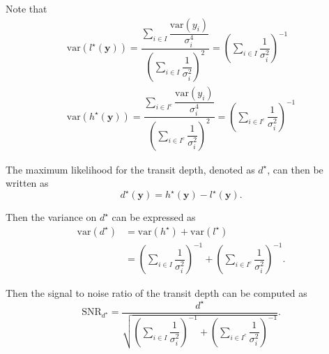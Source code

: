\documentclass{article}
\begin{document}
Note that
\begin{align}
    \mathrm{var}\left(l^{\star}(\bm{y})\right) = \dfrac{\displaystyle\sum_{i \in I}\dfrac{\mathrm{var}(y_i)}{\sigma^4_i}}
    {\displaystyle\left(\sum_{i\in I}\dfrac{1}{\sigma^2_i}\right)^{2}}
    = \displaystyle\left(\sum_{i\in I}\dfrac{1}{\sigma^2_i}\right)^{-1}\\
    \mathrm{var}\left(h^{\star}(\bm{y})\right) = \dfrac{\displaystyle\sum_{i \in I^c}\dfrac{\mathrm{var}(y_i)}{\sigma^4_i}}
    {\displaystyle\left(\sum_{i\in I^c}\dfrac{1}{\sigma^2_i}\right)^{2}}
    = \displaystyle\left(\sum_{i\in I^c}\dfrac{1}{\sigma^2_i}\right)^{-1}
\end{align}

The maximum likelihood for the transit depth, denoted as $d^{\star}$, can then be written as
\begin{equation}
    d^{\star}(\bm{y}) = h^{\star}(\bm{y}) - l^{\star}(\bm{y}).
\end{equation}

Then the variance on $d^{\star}$ can be expressed as
\begin{align}
    \mathrm{var}\left(d^{\star}\right) &= \mathrm{var}\left(h^{\star}\right) + \mathrm{var}\left(l^{\star}\right)\\
    &= \displaystyle\left(\sum_{i\in I}\dfrac{1}{\sigma^2_i}\right)^{-1}
    + \displaystyle\left(\sum_{i\in I^c}\dfrac{1}{\sigma^2_i}\right)^{-1}.
\end{align}

Then the signal to noise ratio of the transit depth can be computed as
\begin{equation}
    \mathrm{SNR}_{d^{\star}}= \dfrac{d^{\star}}{\sqrt{\displaystyle\left(\sum_{i\in I}\dfrac{1}{\sigma^2_i}\right)^{-1}
                                            + \displaystyle\left(\sum_{i\in I^c}\dfrac{1}{\sigma^2_i}\right)^{-1}}}.
\end{equation}
\end{document}
